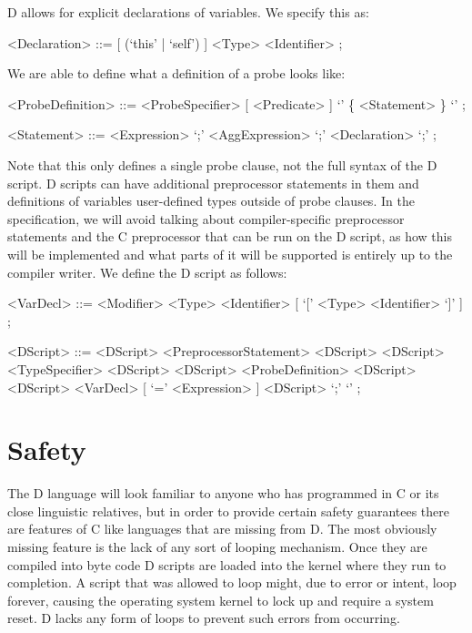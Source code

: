 \noindent
D allows for explicit declarations of variables. We specify this as:
\begin{grammar}
<Declaration> ::= [ (`this' | `self') ] <Type> <Identifier> ;
\end{grammar}

\noindent
We are able to define what a definition of a probe looks like:
\begin{grammar}
<ProbeDefinition> ::= <ProbeSpecifier> [ <Predicate> ] `{'  \{ <Statement> \} `}' ;

<Statement> ::=  <Expression> `;'
            \alt <AggExpression> `;'
            \alt <Declaration> `;' ;
\end{grammar}

\noindent
Note that this only defines a single probe clause, not the full syntax
of the D script.  D scripts can have additional preprocessor
statements in them and definitions of variables user-defined types
outside of probe clauses. In the specification, we will avoid talking
about compiler-specific preprocessor statements and the C preprocessor
that can be run on the D script, as how this will be implemented and
what parts of it will be supported is entirely up to the compiler
writer. We define the D script as follows:
\begin{grammar}
<VarDecl> ::= <Modifier> <Type> <Identifier> [ `[' <Type> <Identifier> `]' ] ;

<DScript> ::=  <DScript> <PreprocessorStatement> <DScript>
          \alt <DScript> <TypeSpecifier> <DScript>
          \alt <DScript> <ProbeDefinition> <DScript>
          \alt <DScript> <VarDecl> [ `=' <Expression> ] <DScript>
          \alt `;'
          \alt `' ;
\end{grammar}

\section{Safety}
\label{sec:safety}

The D language will look familiar to anyone who has programmed in C or
its close linguistic relatives, but in order to provide certain
safety guarantees there are features of C like languages that are
missing from D.  The most obviously missing feature is the lack of any
sort of looping mechanism.  Once they are compiled into byte code D
scripts are loaded into the kernel where they run to completion.  A
script that was allowed to loop might, due to error or intent, loop
forever, causing the operating system kernel to lock up and require a
system reset. D lacks any form of loops to prevent such errors from
occurring.

